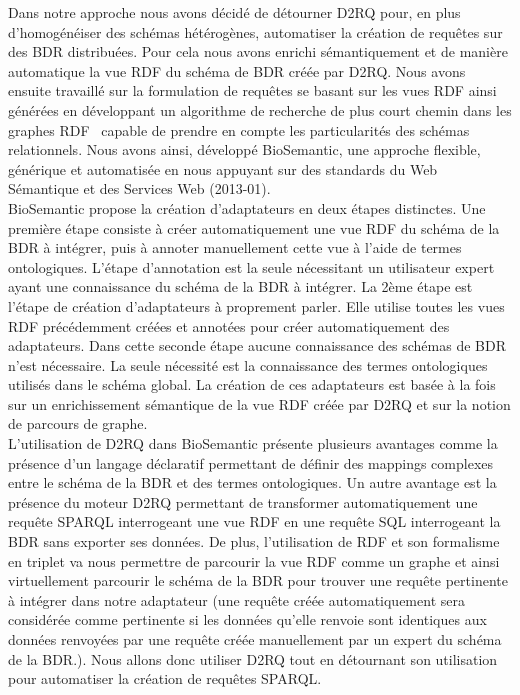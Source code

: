 Dans notre approche nous avons décidé de détourner D2RQ pour, en plus d'homogénéiser des schémas hétérogènes, automatiser la création de requêtes sur des BDR distribuées. Pour cela nous avons enrichi sémantiquement et de manière automatique la vue RDF du schéma de BDR créée par D2RQ. Nous avons ensuite travaillé sur la formulation de requêtes se basant sur les vues RDF ainsi générées en développant un algorithme de recherche de plus court chemin dans les graphes RDF~\cite{wollbrett2013clever} capable de prendre en compte les particularités des schémas relationnels. Nous avons ainsi, développé BioSemantic, une approche flexible, générique et automatisée en nous appuyant sur des standards du Web Sémantique et des Services Web (2013-01). \\

BioSemantic propose la création d'adaptateurs en deux étapes distinctes. Une première étape consiste à créer automatiquement une vue RDF du schéma de la BDR à intégrer, puis à annoter manuellement cette vue à l'aide de termes ontologiques. L'étape d'annotation est la seule nécessitant un utilisateur expert ayant une connaissance du schéma de la BDR à intégrer. La 2ème étape est l'étape de création d'adaptateurs à proprement parler. Elle utilise toutes les vues RDF précédemment créées et annotées pour créer automatiquement des adaptateurs. Dans cette seconde étape aucune connaissance des schémas de BDR n'est nécessaire. La seule nécessité est la connaissance des termes ontologiques utilisés dans le schéma global. La création de ces adaptateurs est basée à la fois sur un enrichissement sémantique de la vue RDF créée par D2RQ et sur la notion de parcours de graphe.\\

L'utilisation de D2RQ dans BioSemantic présente plusieurs avantages comme la présence d'un langage déclaratif permettant de définir des mappings complexes entre le schéma de la BDR et des termes ontologiques. Un autre avantage est la présence du moteur D2RQ permettant de transformer automatiquement une requête SPARQL interrogeant une vue RDF en une requête SQL interrogeant la BDR sans exporter ses données. De plus, l'utilisation de RDF et son formalisme en triplet va nous permettre de parcourir la vue RDF comme un graphe et ainsi virtuellement parcourir le schéma de la BDR pour trouver une requête pertinente à intégrer dans notre adaptateur (une requête créée automatiquement sera considérée comme pertinente si les données qu'elle renvoie sont identiques aux données renvoyées par une requête créée manuellement par un expert du schéma de la BDR.). Nous allons donc utiliser D2RQ tout en détournant son utilisation pour automatiser la création de requêtes SPARQL.

